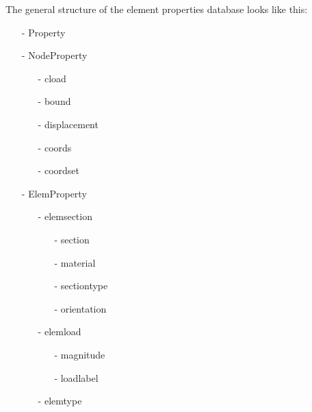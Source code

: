 The general structure of the element properties database looks like this:
\begin{itemize}
\item[-] Property
\item[-] NodeProperty
    \begin{itemize}
    \item[-] cload
    \item[-] bound
    \item[-] displacement
    \item[-] coords
    \item[-] coordset
    \end{itemize}
\item[-] ElemProperty 
    \begin{itemize}
    \item[-] elemsection
        \begin{itemize}
        \item[-] section
        \item[-] material
        \item[-] sectiontype
        \item[-] orientation
        \end{itemize}
    \item[-] elemload
        \begin{itemize}
        \item[-] magnitude
        \item[-] loadlabel
        \end{itemize}
    \item[-] elemtype
    \end{itemize}
\end{itemize}

